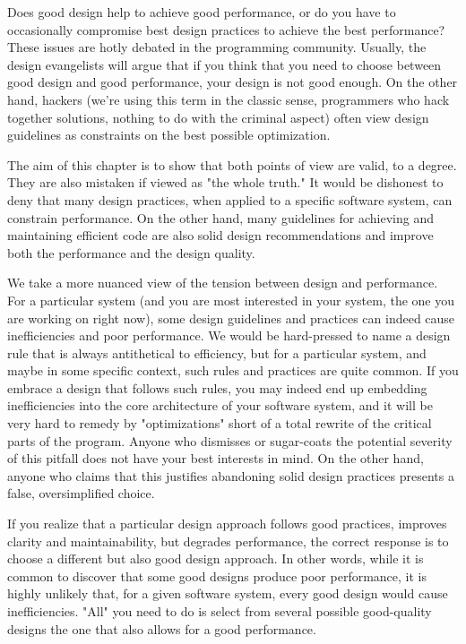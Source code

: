 Does good design help to achieve good performance, or do you have to occasionally compromise best design practices to achieve the best performance? These issues are hotly debated in the programming community. Usually, the design evangelists will argue that if you think that you need to choose between good design and good performance, your design is not good enough. On the other hand, hackers (we're using this term in the classic sense, programmers who hack together solutions, nothing to do with the criminal aspect) often view design guidelines as constraints on the best possible optimization. 

The aim of this chapter is to show that both points of view are valid, to a degree. They are also mistaken if viewed as "the whole truth." It would be dishonest to deny that many design practices, when applied to a specific software system, can constrain performance. On the other hand, many guidelines for achieving and maintaining efficient code are also solid design recommendations and improve both the performance and the design quality. 

We take a more nuanced view of the tension between design and performance. For a particular system (and you are most interested in your system, the one you are working on right now), some design guidelines and practices can indeed cause inefficiencies and poor performance. We would be hard-pressed to name a design rule that is always antithetical to efficiency, but for a particular system, and maybe in some specific context, such rules and practices are quite common. If you embrace a design that follows such rules, you may indeed end up embedding inefficiencies into the core architecture of your software system, and it will be very hard to remedy by "optimizations" short of a total rewrite of the critical parts of the program. Anyone who dismisses or sugar-coats the potential severity of this pitfall does not have your best interests in mind. On the other hand, anyone who claims that this justifies abandoning solid design practices presents a false, oversimplified choice. 

If you realize that a particular design approach follows good practices, improves clarity and maintainability, but degrades performance, the correct response is to choose a different but also good design approach. In other words, while it is common to discover that some good designs produce poor performance, it is highly unlikely that, for a given software system, every good design would cause inefficiencies. "All" you need to do is select from several possible good-quality designs the one that also allows for a good performance. 

